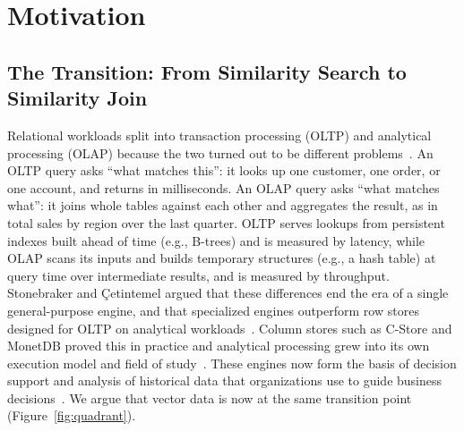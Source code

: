 \section{Motivation}\label{sec:motivation}



\subsection{The Transition: From Similarity Search to Similarity Join}\label{subsec:the-transition}



Relational workloads split into transaction processing (OLTP) and analytical processing (OLAP) because the two turned out to be different problems~\cite{StonebrakerPavloAround24}.
An OLTP query asks ``what matches this'': it looks up one customer, one order, or one account, and returns in milliseconds.
An OLAP query asks ``what matches what'': it joins whole tables against each other and aggregates the result, as in total sales by region over the last quarter.
OLTP serves lookups from persistent indexes built ahead of time (e.g., B-trees) and is measured by latency, while OLAP scans its inputs and builds temporary structures (e.g., a hash table) at query time over intermediate results, and is measured by throughput.
Stonebraker and \c{C}etintemel argued that these differences end the era of a single general-purpose engine, and that specialized engines outperform row stores designed for OLTP on analytical workloads~\cite{StonebrakerOneSize05}.
Column stores such as C-Store and MonetDB proved this in practice and analytical processing grew into its own execution model and field of study~\cite{StonebrakerCStore05, IdreosMonetDB12, StonebrakerPavloAround24}.
These engines now form the basis of decision support and analysis of historical data that organizations use to guide business decisions~\cite{ChaudhuriDayal97}.
We argue that vector data is now at the same transition point (Figure~\ref{fig:quadrant}).


